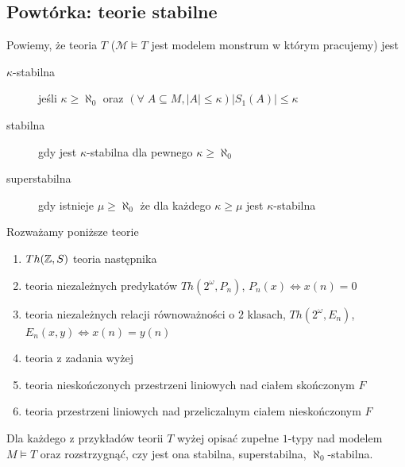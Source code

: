 \subsection{Powtórka: teorie stabilne}

Powiemy, że teoria $T$ ($\mathcal{M}\models T$ jest modelem monstrum w którym pracujemy) jest 
\begin{description}
  \item[$\kappa$-stabilna] jeśli $\kappa\geq \aleph_0$ oraz $(\forall\;A\subseteq M, |A|\leq \kappa)|S_1(A)|\leq \kappa$
  \item[stabilna] gdy jest $\kappa$-stabilna dla pewnego $\kappa\geq\aleph_0$
  \item[superstabilna] gdy istnieje $\mu\geq\aleph_0$ że dla każdego $\kappa\geq\mu$ jest $\kappa$-stabilna
\end{description}

Rozważamy poniższe teorie
\begin{enumerate}
  \item $Th(\mathbb{Z}, S)$ teoria następnika
  \item teoria niezależnych predykatów $Th(2^\omega, P_n)$, $P_n(x)\iff x(n)=0$
  \item teoria niezależnych relacji równoważności o $2$ klasach, $Th(2^\omega, E_n)$, $E_n(x, y)\iff x(n)=y(n)$
  \item teoria z zadania wyżej
  \item teoria nieskończonych przestrzeni liniowych nad ciałem skończonym $F$
  \item teoria przestrzeni liniowych nad przeliczalnym ciałem nieskończonym $F$
\end{enumerate}

\begin{zadanie}
  Dla każdego z przykładów teorii $T$ wyżej opisać zupełne $1$-typy nad modelem $M\models T$ oraz rozstrzygnąć, czy jest ona stabilna, superstabilna, $\aleph_0$-stabilna.
\end{zadanie}

